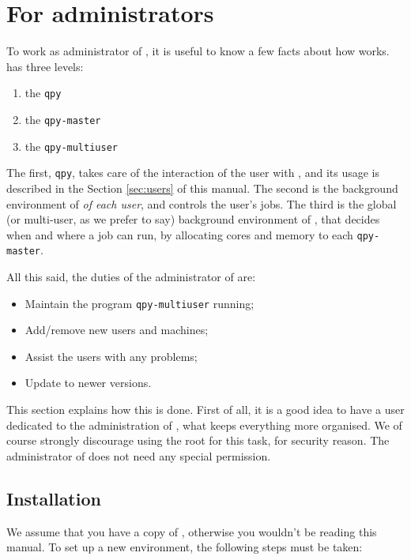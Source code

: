 \documentclass[a4paper,12pt]{article}
\begin{document}
\newpage
\section{For administrators}

To work as administrator of \qpy{}, it is useful to know a few facts about how \qpy{} works.
\qpy{} has three levels:
\begin{enumerate}
\item the \texttt{qpy}
\item the \texttt{qpy-master}
\item the \texttt{qpy-multiuser}
\end{enumerate}
The first, \texttt{qpy}, takes care of the interaction of the user with \qpy{}, and its usage is described in the Section \ref{sec:users} of this manual.
The second is the background environment of \qpy{} \emph{of each user}, and controls the user's jobs.
The third is the global (or multi-user, as we prefer to say) background environment of \qpy{}, that decides when and where a job can run, by allocating cores and memory to each \texttt{qpy-master}.

All this said, the duties of the administrator of \qpy{} are:
\begin{itemize}
\item Maintain the program \texttt{qpy-multiuser} running;
\item Add/remove new users and machines;
\item Assist the users with any problems;
\item Update \qpy{} to newer versions.
\end{itemize}
This section explains how this is done.
First of all, it is a good idea to have a user dedicated to the administration of \qpy{}, what keeps everything more organised.
We of course strongly discourage using the root for this task, for security reason.
The administrator of \qpy{} does not need any special permission.

\subsection{Installation}\label{sec:instal_admin}

We assume that you have a copy of \qpy{}, otherwise you wouldn't be reading this manual.
To set up a new \qpy{} environment, the following steps must be taken:
\end{document}
